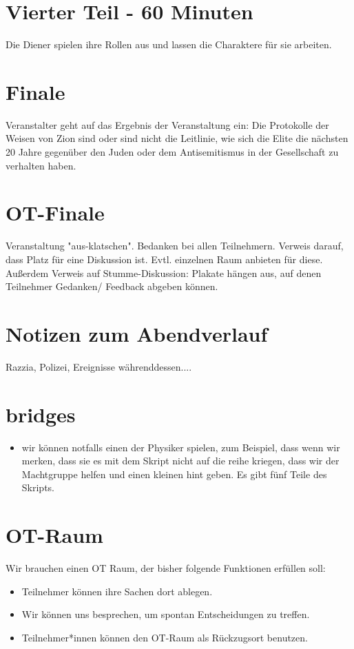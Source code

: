 \documentclass[12pt, a4paper, openany]{report}
\begin{document}
\section{Vierter Teil - 60 Minuten}
Die Diener spielen ihre Rollen aus und lassen die Charaktere für sie arbeiten.\\

\section{Finale}
Veranstalter geht auf das Ergebnis der Veranstaltung ein: Die Protokolle der Weisen von Zion sind oder sind nicht die Leitlinie, wie sich die Elite die nächsten 20 Jahre gegenüber den Juden oder dem Antisemitismus in der Gesellschaft zu verhalten haben.

\section{OT-Finale}
Veranstaltung "aus-klatschen". 
Bedanken bei allen Teilnehmern. 
Verweis darauf, dass Platz für eine Diskussion ist. 
Evtl. einzelnen Raum anbieten für diese.
Außerdem Verweis auf Stumme-Diskussion: Plakate hängen aus, auf denen Teilnehmer Gedanken/ Feedback abgeben können.
 
\section{Notizen zum Abendverlauf}
Razzia, Polizei, Ereignisse währenddessen....

\section {bridges}
\begin{itemize}
    \item wir können notfalls einen der Physiker spielen, zum Beispiel, dass wenn wir merken, dass sie es mit dem Skript nicht auf die reihe kriegen, dass wir der Machtgruppe helfen und einen kleinen hint geben. Es gibt fünf Teile des Skripts.
\end{itemize}
\section{OT-Raum}
Wir brauchen einen OT Raum, der bisher folgende Funktionen erfüllen soll:
\begin{itemize}
    \item Teilnehmer können ihre Sachen dort ablegen.
    \item Wir können uns besprechen, um spontan Entscheidungen zu treffen.
    \item Teilnehmer*innen können den OT-Raum als Rückzugsort benutzen. 
\end{itemize}
\end{document}
